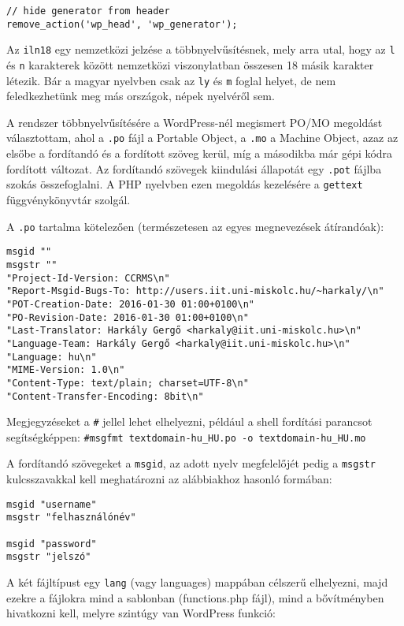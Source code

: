\begin{lstlisting}
// hide generator from header
remove_action('wp_head', 'wp_generator');
\end{lstlisting}


Az \texttt{iln18} egy nemzetközi jelzése a többnyelvűsítésnek, mely arra utal, hogy az \texttt{l} és \texttt{n} karakterek között nemzetközi viszonylatban összesen 18 másik karakter létezik. Bár a magyar nyelvben csak az \verb|ly| és \verb|m| foglal helyet, de nem feledkezhetünk meg más országok, népek nyelvéről sem.

A rendszer többnyelvűsítésére a WordPress-nél megismert PO/MO megoldást választottam, ahol a \texttt{.po} fájl a Portable Object, a \texttt{.mo} a Machine Object, azaz az elsőbe a fordítandó és a fordított szöveg kerül, míg a másodikba már gépi kódra fordított változat. Az fordítandó szövegek kiindulási állapotát egy \texttt{.pot} fájlba szokás összefoglalni. A PHP nyelvben ezen megoldás kezelésére a \texttt{gettext} függvénykönyvtár szolgál.

A \texttt{.po} tartalma kötelezően (természetesen az egyes megnevezések átírandóak):

\begin{lstlisting}
msgid ""
msgstr ""
"Project-Id-Version: CCRMS\n"
"Report-Msgid-Bugs-To: http://users.iit.uni-miskolc.hu/~harkaly/\n"
"POT-Creation-Date: 2016-01-30 01:00+0100\n"
"PO-Revision-Date: 2016-01-30 01:00+0100\n"
"Last-Translator: Harkály Gergő <harkaly@iit.uni-miskolc.hu>\n"
"Language-Team: Harkály Gergő <harkaly@iit.uni-miskolc.hu>\n"
"Language: hu\n"
"MIME-Version: 1.0\n"
"Content-Type: text/plain; charset=UTF-8\n"
"Content-Transfer-Encoding: 8bit\n"
\end{lstlisting}

Megjegyzéseket a \texttt{\#} jellel lehet elhelyezni, például a shell fordítási parancsot segítségképpen: \texttt{\#msgfmt textdomain-hu\_HU.po -o textdomain-hu\_HU.mo}

A fordítandó szövegeket a \texttt{msgid}, az adott nyelv megfelelőjét pedig a \texttt{msgstr} kulcsszavakkal kell meghatározni az alábbiakhoz hasonló formában:

\begin{lstlisting}
msgid "username"
msgstr "felhasználónév"

msgid "password"
msgstr "jelszó"
\end{lstlisting}

A két fájltípust egy \texttt{lang} (vagy languages) mappában célszerű elhelyezni, majd ezekre a fájlokra mind a sablonban (functions.php fájl), mind a bővítményben hivatkozni kell, melyre szintúgy van WordPress funkció:

